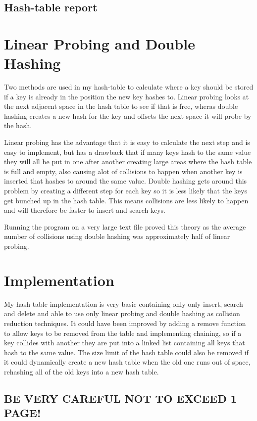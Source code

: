 \documentclass[12pt]{article} %
\begin{document}
\pagestyle{empty} %

\begin{center}
\section*{Hash-table report}
\end{center}

\section{Linear Probing and Double Hashing}

Two methods are used in my hash-table to calculate where a key
should be stored if a key is already in the position the new
key hashes to. Linear probing looks at the next adjacent space
in the hash table to see if that is free, wheras double hashing
creates a new hash for the key and offsets the next space it will
probe by the hash. 

Linear probing has the advantage that it is easy to calculate the
next step and is easy to implement, but has a drawback that if many
keys hash to the same value they will all be put in one after another
creating large areas where the hash table is full and empty, also 
causing alot of collisions to happen when another key is inserted
that hashes to around the same value. Double hashing gets around 
this problem by creating a different step for each key so it is 
less likely that the keys get bunched up in the hash table. This 
means collisions are less likely to happen and will therefore be
faster to insert and search keys.

Running the program on a very large text file proved this theory as 
the average number of collisions using double hashing was approximately
half of linear probing.

\section{Implementation}

My hash table implementation is very basic containing only only insert,
search and delete and able to use only linear probing and double hashing
as collision reduction techniques. It could have been improved by adding
a remove function to allow keys to be removed from the table and
implementing chaining, so if a key collides with another they are put
into a linked list containing all keys that hash to the same value. 
The size limit of the hash table could also be removed if it could
dynamically create a new hash table when the old one runs out of space,
rehashing all of the old keys into a new hash table.

\subsection*{BE VERY CAREFUL NOT TO EXCEED 1 PAGE!}
\end{document}
